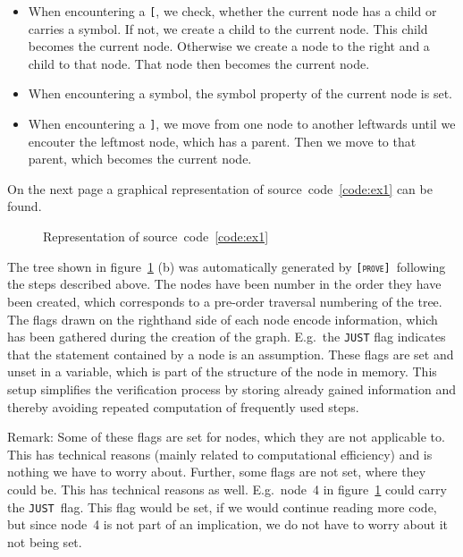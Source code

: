 \documentclass[british]{article}
\newcommand\prv{bc}
\newcommand\m[1]{\texttt{#1}}
\newcommand\name{\texttt{\textsc{[prove]}}}
\begin{document}
\begin{itemize}
	\item 
		When encountering a \m{[}, we check, whether the current node has a
		child or carries a symbol. If not, we create a child to the current
		node. This child becomes the current node. Otherwise we create a
		node to the right and a child to that node. That node then becomes
		the current node.
	\item
		When encountering a symbol, the symbol property of the current node is
		set.
	\item
		When encountering a \m{]}, we move from one node to another leftwards
		until we encouter the leftmost node, which has a parent. Then we move to
		that parent, which becomes the current node.
\end{itemize}

On the next page a graphical representation of
source~code~\ref{code:ex1} can be found.
\pagebreak{}

\begin{figure}[!ht]
\caption{Representation of source~code~\ref{code:ex1}}\label{fig:ex1}
\centering
{}
\end{figure}

The tree shown in figure~\ref{fig:ex1} (b) was automatically generated by \name\
following the steps described above. The nodes have been number in the order
they have been created, which corresponds to a pre-order traversal numbering of
the tree. The flags drawn on the righthand side of each node
encode information, which has been gathered during the creation of the graph.
E.g.\ the \texttt{JUST} flag indicates that the statement contained by a node is
an assumption. These flags are set and unset in a variable, which is part of the
structure of the node in memory. This setup simplifies the verification process
by storing already gained information and thereby avoiding repeated computation
of frequently used steps.\newline

Remark: Some of these flags are set for nodes, which they are not applicable to.
This has technical reasons (mainly related to computational efficiency) and is
nothing we have to worry about. Further, some flags are not set, where they
could be. This has technical reasons as well. E.g.\ node~4 in
figure~\ref{fig:ex1} could carry the \texttt{JUST}~flag. This flag would be set,
if we would continue reading more code, but since node~4 is not part of an
implication, we do not have to worry about it not being set.
\end{document}

